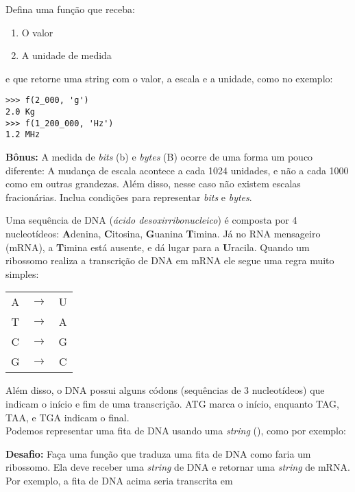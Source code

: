 	\quest Defina uma função que receba:
	\begin{enumerate}
		\item O valor
		\item A unidade de medida
	\end{enumerate}
	e que retorne uma string com o valor, a escala e a unidade, como no exemplo:
	
	\begin{lstlisting}
>>> f(2_000, 'g')
2.0 Kg
>>> f(1_200_000, 'Hz')
1.2 MHz 
	\end{lstlisting}

	\textbf{Bônus:} A medida de \textit{bits} (b) e \textit{bytes} (B) ocorre de uma forma um pouco diferente: A mudança de escala acontece a cada 1024 unidades, e não a cada 1000 como em outras grandezas. Além disso, nesse caso não existem escalas fracionárias. Inclua condições para representar \textit{bits} e \textit{bytes}.
	
	
	
	Uma sequência de DNA (\emph{ácido desoxirribonucleico}) é composta por 4 nucleotídeos: \textbf{A}denina, \textbf{C}itosina, \textbf{G}uanina \textbf{T}imina. Já no RNA mensageiro (mRNA), a \textbf{T}imina está ausente, e dá lugar para a \textbf{U}racila. Quando um ribossomo realiza a transcrição de DNA em mRNA ele segue uma regra muito simples:
		
	\begin{center}
			\begin{tabular}{ccc}
				A & $\rightarrow$ & U\\
				T & $\rightarrow$ & A\\
				C & $\rightarrow$ & G\\
				G & $\rightarrow$ & C\\
			\end{tabular}
	\end{center}
	
	Além disso, o DNA possui alguns códons (sequências de 3 nucleotídeos) que indicam o início e fim de uma transcrição. ATG marca o início, enquanto TAG, TAA, e TGA indicam o final.\\
	
	Podemos representar uma fita de DNA usando uma \emph{string} (), como por exemplo:
	\begin{center}
	\end{center}
	
	\textbf{Desafio:} Faça uma função que traduza uma fita de DNA como faria um ribossomo. Ela deve receber uma \textit{string} de DNA e retornar uma \textit{string} de mRNA. Por exemplo, a fita de DNA acima seria transcrita em
	\begin{center}
	\end{center}
	
